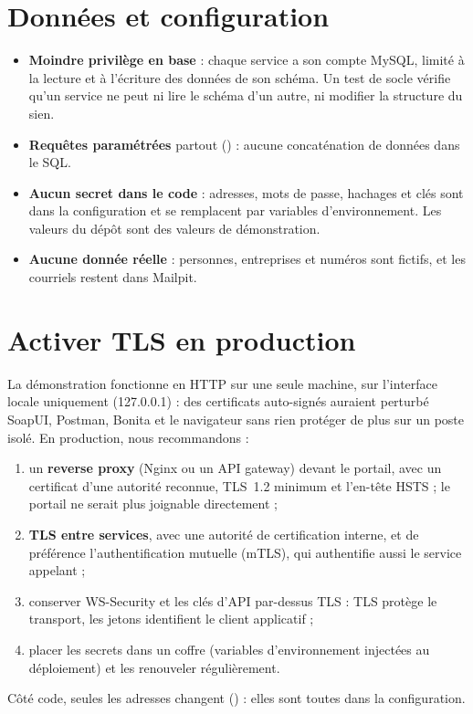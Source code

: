 \section{Données et configuration}

\begin{itemize}
  \item \textbf{Moindre privilège en base} : chaque service a son compte MySQL, limité à la lecture et à l'écriture des données de son schéma. Un test de socle vérifie qu'un service ne peut ni lire le schéma d'un autre, ni modifier la structure du sien.
  \item \textbf{Requêtes paramétrées} partout () : aucune concaténation de données dans le SQL.
  \item \textbf{Aucun secret dans le code} : adresses, mots de passe, hachages et clés sont dans la configuration et se remplacent par variables d'environnement. Les valeurs du dépôt sont des valeurs de démonstration.
  \item \textbf{Aucune donnée réelle} : personnes, entreprises et numéros sont fictifs, et les courriels restent dans Mailpit.
\end{itemize}

\section{Activer TLS en production}\label{sec:tls}

La démonstration fonctionne en HTTP sur une seule machine, sur l'interface locale uniquement (127.0.0.1) : des certificats auto-signés auraient perturbé SoapUI, Postman, Bonita et le navigateur sans rien protéger de plus sur un poste isolé. En production, nous recommandons :
\begin{enumerate}
  \item un \textbf{reverse proxy} (Nginx ou un API gateway) devant le portail, avec un certificat d'une autorité reconnue, TLS~1.2 minimum et l'en-tête HSTS ; le portail ne serait plus joignable directement ;
  \item \textbf{TLS entre services}, avec une autorité de certification interne, et de préférence l'authentification mutuelle (mTLS), qui authentifie aussi le service appelant ;
  \item conserver WS-Security et les clés d'API par-dessus TLS : TLS protège le transport, les jetons identifient le client applicatif ;
  \item placer les secrets dans un coffre (variables d'environnement injectées au déploiement) et les renouveler régulièrement.
\end{enumerate}
Côté code, seules les adresses changent () : elles sont toutes dans la configuration.

